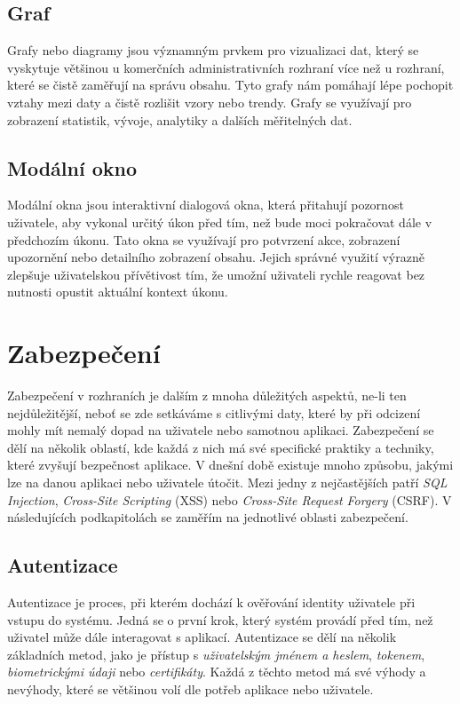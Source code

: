 \subsection*{Graf}
\label{subsec:admin-tags-chart}
Grafy nebo diagramy jsou významným prvkem pro vizualizaci dat, který se vyskytuje většinou u komerčních administrativních rozhraní více než u rozhraní, které se čistě zaměřují na správu obsahu. Tyto grafy nám pomáhají lépe pochopit vztahy mezi daty a čistě rozlišit vzory nebo trendy. Grafy se využívají pro zobrazení statistik, vývoje, analytiky a dalších měřitelných dat.

\subsection*{Modální okno}
\label{subsec:admin-tags-modal}
Modální okna jsou interaktivní dialogová okna, která přitahují pozornost uživatele, aby vykonal určitý úkon před tím, než bude moci pokračovat dále v předchozím úkonu. Tato okna se využívají pro potvrzení akce, zobrazení upozornění nebo detailního zobrazení obsahu. Jejich správné využití výrazně zlepšuje uživatelskou přívětivost tím, že umožní uživateli rychle reagovat bez nutnosti opustit aktuální kontext úkonu.

\section{Zabezpečení}
\label{sec:security}
Zabezpečení v rozhraních je dalším z mnoha důležitých aspektů, ne-li ten nejdůležitější, neboť se zde setkáváme s citlivými daty, které by při odcizení mohly mít nemalý dopad na uživatele nebo samotnou aplikaci. Zabezpečení se dělí na několik oblastí, kde každá z nich má své specifické praktiky a techniky, které zvyšují bezpečnost aplikace. V dnešní době existuje mnoho způsobu, jakými lze na danou aplikaci nebo uživatele útočit. Mezi jedny z nejčastějších patří \textit{SQL Injection}, \textit{Cross-Site Scripting} (XSS) nebo \textit{Cross-Site Request Forgery} (CSRF). V následujících podkapitolách se zaměřím na jednotlivé oblasti zabezpečení.

\subsection{Autentizace}
\label{subsec:security-authentication}
Autentizace je proces, při kterém dochází k ověřování identity uživatele při vstupu do systému. Jedná se o první krok, který systém provádí před tím, než uživatel může dále interagovat s aplikací. Autentizace se dělí na několik základních metod, jako je přístup s \textit{uživatelským jménem a heslem}, \textit{tokenem}, \textit{biometrickými údaji} nebo \textit{certifikáty}. Každá z těchto metod má své výhody a nevýhody, které se většinou volí dle potřeb aplikace nebo uživatele.

